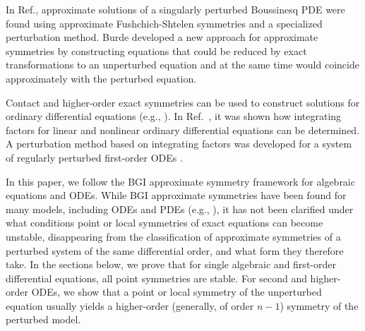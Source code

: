 \documentclass[11pt,letter,subeqn]{article}
\begin{document}
In Ref.\cite{jiao2008approximate}, approximate solutions of a singularly perturbed Boussinesq PDE were found using approximate Fushchich-Shtelen symmetries and a specialized perturbation method. Burde \cite{burde2001potential} developed a new approach for approximate symmetries by constructing equations that could be reduced by exact transformations to an unperturbed equation and at the same time would coincide approximately with the perturbed equation.

Contact and higher-order exact symmetries can be used to construct solutions for ordinary differential equations (e.g., \cite{bluman2008symmetry}). In Ref.~\cite{ibragimov2006integrating}, it was shown how integrating factors for linear and nonlinear ordinary differential equations can be determined. A perturbation method based on integrating factors was developed for a system of regularly perturbed first-order ODEs \cite{van1999perturbation}.

In this paper, we follow the BGI approximate symmetry framework for algebraic equations and ODEs. While BGI approximate symmetries have been found for many models, including ODEs and PDEs (e.g., \cite{grebenev2007approximate,unal2000periodic,baikov1989,baikov1991,baikov1993,ibragimov1995crc,gazizov1996lie}), it has not been clarified under what conditions point or local symmetries of exact equations can become unstable, disappearing from the classification of approximate symmetries of a perturbed system of the same differential order, and what form they therefore take. In the sections below, we prove that for single algebraic and first-order differential equations, all point symmetries are stable. For second and higher-order ODEs, we show that a point or local symmetry of the unperturbed equation usually yields a higher-order (generally, of order $n-1$) symmetry of the perturbed model.
\end{document}
